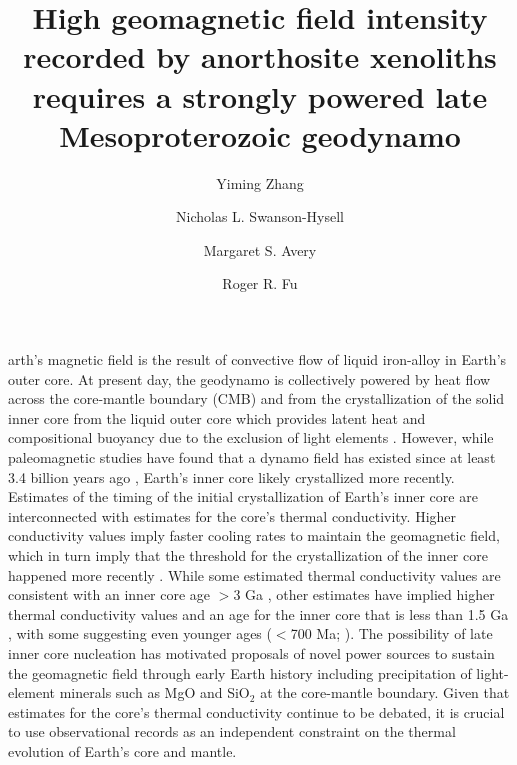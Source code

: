 \documentclass[9pt,twocolumn,twoside,lineno]{pnas-new}
\title{High geomagnetic field intensity recorded by anorthosite xenoliths requires a strongly powered late Mesoproterozoic geodynamo}
\author[a,1]{Yiming Zhang}
\author[a]{Nicholas L. Swanson-Hysell}
\author[a,b]{Margaret S. Avery}
\author[c]{Roger R. Fu}
\affil[a]{Department of Earth and Planetary Science, University of California, Berkeley, CA, 94720}
\affil[b]{U.S. Geological Survey, Moffett Field, CA, 94035}
\affil[c]{Department of Earth and Planetary Sciences, Harvard University, Cambridge, MA, 02138}
\begin{document}
\maketitle
\thispagestyle{firststyle}

arth's magnetic field is the result of convective flow of liquid iron-alloy in Earth's outer core. At present day, the geodynamo is collectively powered by heat flow across the core-mantle boundary (CMB) and from the crystallization of the solid inner core from the liquid outer core which provides latent heat and compositional buoyancy due to the exclusion of light elements \cite{Buffett2000a}. However, while paleomagnetic studies have found that a dynamo field has existed since at least 3.4 billion years ago \cite{Selkin2007a, Biggin2011a, Tarduno2014a, Brenner2020a}, Earth's inner core likely crystallized more recently. Estimates of the timing of the initial crystallization of Earth's inner core are interconnected with estimates for the core's thermal conductivity. Higher conductivity values imply faster cooling rates to maintain the geomagnetic field, which in turn imply that the threshold for the crystallization of the inner core happened more recently \cite{Davies2015a}. While some estimated thermal conductivity values are consistent with an inner core age $>$3 Ga \cite{Gubbins2004a, Konopkova2016a}, other estimates have implied higher thermal conductivity values and an age for the inner core that is less than 1.5 Ga \cite{Pozzo2012a, Koker2012a, Gomi2013a, Zhang2020b, Frost2022a}, with some suggesting even younger ages ($<$700 Ma; \citealp{Labrosse2015a, Ohta2016a, Pozzo2022a}). The possibility of late inner core nucleation has motivated proposals of novel power sources to sustain the geomagnetic field through early Earth history including precipitation of light-element minerals such as MgO \cite{Badro2016a, ORourke2016a, ORourke2016b} and SiO$_2$ \cite{Mittal2020a} at the core-mantle boundary. Given that estimates for the core's thermal conductivity continue to be debated, it is crucial to use observational records as an independent constraint on the thermal evolution of Earth's core and mantle.
\end{document}
